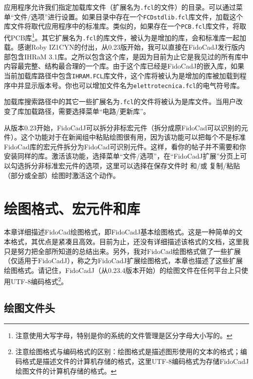 \documentclass[10pt,a4paper,twoside]{scrreprt}
\begin{document}
应用程序允许我们指定加载库文件（扩展名为\lstinline!.fcl!的文件）的目录。可以通过菜单{}“文件/选项”进行设置。如果目录中存在一个\lstinline!FCDstdlib.fcl!库文件，加载这个库文件将取代应用程序中的标准库。类似的，如果存在一个\lstinline!PCB.fcl!库文件，将取代PCB库\footnote{注意使用大写字母，特别是你的系统的文件管理是区分字母大小写的。}。其它扩展名为\lstinline!.fcl!的库文件，被认为是增加的库，会和标准库一起加载。感谢Roby IZ1CYN的付出，从0.23版开始，我可以直接在FidoCadJ发行版内部包含IHRaM 3.1库。之所以包含这个库，是因为目前为止它是我见过的所有库中内容最完整、结构最合理的一个库。由于这个库已经是FidoCadJ的嵌入库，如果当前加载库路径中包含\lstinline!IHRAM.FCL!库文件，这个库将被认为是增加的库被加载到程序中并显示版本号。你也可以增加文件名为\lstinline!elettrotecnica.fcl!的电气符号库。

加载库搜索路径中的其它一些扩展名为\lstinline!.fcl!的文件将被认为是库文件。当用户改变了库加载路径，需要选择菜单“电路/更新库”。

从版本0.23开始，FidoCadJ可以拆分非标宏元件（拆分成原FidoCad可以识别的元件）。这个功能对于在新闻组中粘贴绘图很有用，因为该功能可以把每个不是标准FidoCad库的宏元件拆分为FidoCad可识别元件。这样，看你的帖子并不需要和你安装同样的库。激活该功能，选择菜单“文件/选项”，在“FidoCadJ扩展”分页上可以勾选拆分非标准宏元件的选项，这里可以选择在保存文件时 和/或 复制/粘贴（部分或全部）绘图时激活这个动作。

\chapter{绘图格式、宏元件和库} \label{chap_formato}

本章详细描述FidoCad绘图格式，即FidoCadJ基本绘图格式。这是一种简单的文本格式，其优点是紧凑且高效。目前为止，还没有详细描述该格式的文档，这里我只是努力把全部所知道的总结出来。另外，我对FidoCad绘图格式做了一些扩展（仅适用于FidoCadJ），称之为FidoCadJ扩展绘图格式，本章也描述了这些扩展绘图格式。请记住，FidoCadJ（从0.23.4版本开始）的绘图文件在任何平台上只使用UTF-8编码格式\footnote{注意绘图格式与编码格式的区别：绘图格式是描述图形使用的文本的格式；编码格式是描述文件的计算机存储的格式，这里UTF-8编码格式为存储FidoCadJ绘图文件的计算机存储的格式。 }。

\section{绘图文件头}
\end{document}
